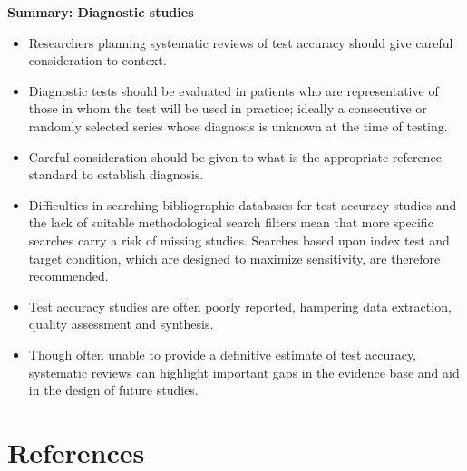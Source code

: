 \documentclass[
  11pt,
  a4paper,
  DIV=11,
  numbers=noendperiod]{scrreprt}
\begin{document}
\textbf{Summary: Diagnostic studies}

\begin{itemize}
\item
  Researchers planning systematic reviews of test accuracy should give
  careful consideration to context.
\item
  Diagnostic tests should be evaluated in patients who are
  representative of those in whom the test will be used in practice;
  ideally a consecutive or randomly selected series whose diagnosis is
  unknown at the time of testing.
\item
  Careful consideration should be given to what is the appropriate
  reference standard to establish diagnosis.
\item
  Difficulties in searching bibliographic databases for test accuracy
  studies and the lack of suitable methodological search filters mean
  that more specific searches carry a risk of missing studies. Searches
  based upon index test and target condition, which are designed to
  maximize sensitivity, are therefore recommended.
\item
  Test accuracy studies are often poorly reported, hampering data
  extraction, quality assessment and synthesis.
\item
  Though often unable to provide a definitive estimate of test accuracy,
  systematic reviews can highlight important gaps in the evidence base
  and aid in the design of future studies.
\end{itemize}


\chapter*{References}\label{references}

\end{document}
